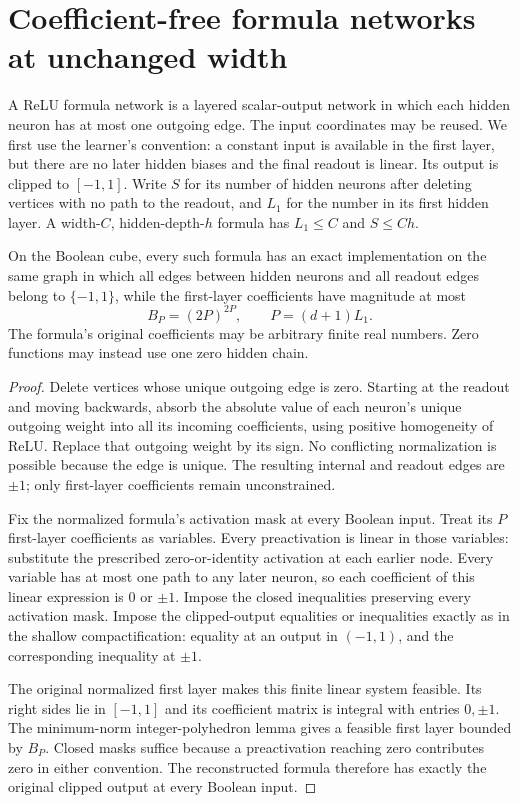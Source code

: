 \section{Coefficient-free formula networks at unchanged width}
\label{sec:formula-compactification}
A ReLU formula network is a layered scalar-output network in which each hidden neuron has at most one outgoing edge. The input coordinates may be reused. We first use the learner's convention: a constant input is available in the first layer, but there are no later hidden biases and the final readout is linear. Its output is clipped to $[-1,1]$. Write $S$ for its number of hidden neurons after deleting vertices with no path to the readout, and $L_1$ for the number in its first hidden layer. A width-$C$, hidden-depth-$h$ formula has $L_1\le C$ and $S\le Ch$.

\begin{lemma}
\label{lem:formula-compactification}
On the Boolean cube, every such formula has an exact implementation on the same graph in which all edges between hidden neurons and all readout edges belong to $\{-1,1\}$, while the first-layer coefficients have magnitude at most
\[
 B_P=(2P)^{2P},\qquad P=(d+1)L_1.
\]
The formula's original coefficients may be arbitrary finite real numbers. Zero functions may instead use one zero hidden chain.
\end{lemma}
\begin{proof}
Delete vertices whose unique outgoing edge is zero. Starting at the readout and moving backwards, absorb the absolute value of each neuron's unique outgoing weight into all its incoming coefficients, using positive homogeneity of ReLU. Replace that outgoing weight by its sign. No conflicting normalization is possible because the edge is unique. The resulting internal and readout edges are $\pm1$; only first-layer coefficients remain unconstrained.

Fix the normalized formula's activation mask at every Boolean input. Treat its $P$ first-layer coefficients as variables. Every preactivation is linear in those variables: substitute the prescribed zero-or-identity activation at each earlier node. Every variable has at most one path to any later neuron, so each coefficient of this linear expression is $0$ or $\pm1$. Impose the closed inequalities preserving every activation mask. Impose the clipped-output equalities or inequalities exactly as in the shallow compactification: equality at an output in $(-1,1)$, and the corresponding inequality at $\pm1$.

The original normalized first layer makes this finite linear system feasible. Its right sides lie in $[-1,1]$ and its coefficient matrix is integral with entries $0,\pm1$. The minimum-norm integer-polyhedron lemma gives a feasible first layer bounded by $B_P$. Closed masks suffice because a preactivation reaching zero contributes zero in either convention. The reconstructed formula therefore has exactly the original clipped output at every Boolean input.
\end{proof}

